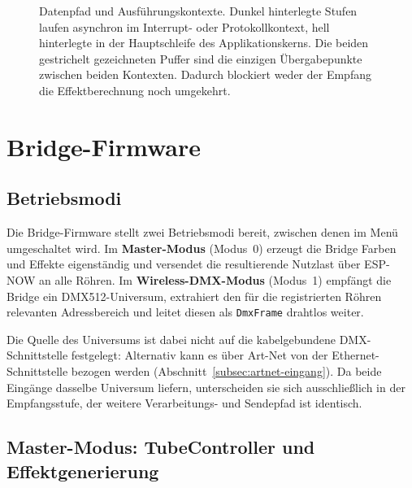 \begin{figure}[H]
    \caption{Datenpfad und Ausführungskontexte. Dunkel hinterlegte Stufen laufen
        asynchron im Interrupt- oder Protokollkontext, hell hinterlegte in der
        Hauptschleife des Applikationskerns. Die beiden gestrichelt gezeichneten Puffer
        sind die einzigen Übergabepunkte zwischen beiden Kontexten. Dadurch blockiert
        weder der Empfang die Effektberechnung noch umgekehrt.}
    \label{fig:datenpfad}
\end{figure}

\section{Bridge-Firmware}
\label{sec:bridge-firmware}

\subsection{Betriebsmodi}
\label{subsec:bridge-modi}

Die Bridge-Firmware stellt zwei Betriebsmodi bereit, zwischen denen im
Menü umgeschaltet wird. Im \textbf{Master-Modus} (Modus~0) erzeugt die
Bridge Farben und Effekte eigenständig und versendet die resultierende
Nutzlast über ESP-NOW an alle Röhren. Im \textbf{Wireless-DMX-Modus}
(Modus~1) empfängt die Bridge ein DMX512-Universum, extrahiert den für
die registrierten Röhren relevanten Adressbereich und leitet diesen als
\texttt{DmxFrame} drahtlos weiter.

Die Quelle des Universums ist dabei nicht auf die kabelgebundene
DMX-Schnittstelle festgelegt: Alternativ kann es über Art-Net von der
Ethernet-Schnittstelle bezogen werden
(Abschnitt~\ref{subsec:artnet-eingang}). Da beide Eingänge dasselbe
Universum liefern, unterscheiden sie sich ausschließlich in der
Empfangsstufe, der weitere Verarbeitungs- und Sendepfad ist identisch.

\subsection{Master-Modus: TubeController und Effektgenerierung}
\label{subsec:tubecontroller}

